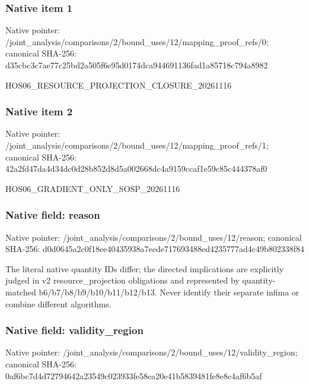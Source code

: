 \documentclass[10pt,a4paper]{article}
\begin{document}
\subsubsection{Native item 1}
Native pointer: /joint\_\allowbreak{}analysis/comparisons/2/bound\_\allowbreak{}uses/12/mapping\_\allowbreak{}proof\_\allowbreak{}refs/0; canonical SHA-256: d35cbc3c7ae77c25bd2a505f6e95d0174dca944691136fad1a85718c794a8982

\begingroup\raggedright\sloppy HOS06\_\allowbreak{}RESOURCE\_\allowbreak{}PROJECTION\_\allowbreak{}CLOSURE\_\allowbreak{}20261116\par\endgroup

\subsubsection{Native item 2}
Native pointer: /joint\_\allowbreak{}analysis/comparisons/2/bound\_\allowbreak{}uses/12/mapping\_\allowbreak{}proof\_\allowbreak{}refs/1; canonical SHA-256: 42a2fd47da4d34dc0d28b852d8d5a002668dc4a9159ccaf1e59c85c444378af0

\begingroup\raggedright\sloppy HOS06\_\allowbreak{}GRADIENT\_\allowbreak{}ONLY\_\allowbreak{}SOSP\_\allowbreak{}20261116\par\endgroup

\subsubsection{Native field: reason}
Native pointer: /joint\_\allowbreak{}analysis/comparisons/2/bound\_\allowbreak{}uses/12/reason; canonical SHA-256: d0d0645a2c0f18ee40435938a7eede717693488ed4235777ad4c49b802338f84

\begingroup\raggedright\sloppy The literal native quantity IDs differ;\allowbreak{} the directed implications are explicitly judged in v2 resource\_\allowbreak{}projection obligations and represented by quantity-matched b6/\allowbreak{}b7/\allowbreak{}b8/\allowbreak{}b9/\allowbreak{}b10/\allowbreak{}b11/\allowbreak{}b12/\allowbreak{}b13. Never identify their separate infima or combine different algorithms.\par\endgroup

\subsubsection{Native field: validity\_\allowbreak{}region}
Native pointer: /joint\_\allowbreak{}analysis/comparisons/2/bound\_\allowbreak{}uses/12/validity\_\allowbreak{}region; canonical SHA-256: 0af6bc7d4d72794642a23549c023933fe58ea20e41b5839481fe8e8c4af6b5af
\end{document}
